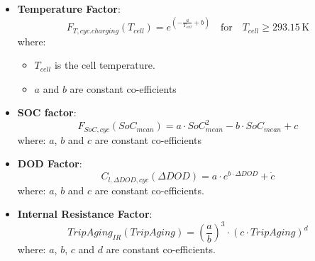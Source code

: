 \begin{itemize}
    \item \textbf{Temperature Factor}:
    \begin{equation}
        F_{T,cyc.charging}(T_{cell}) = e^{\left(-\frac{a}{T_{cell}} + b\right)} \quad \text{for} \quad T_{cell} \geq 293.15 \, \text{K}
    \end{equation}
    where:
    \begin{itemize}
        \item $T_{cell}$ is the cell temperature.
        \item $a$ and $b$ are constant co-efficients
    \end{itemize}

    \item \textbf{SOC factor}: 
    \begin{equation}
        F_{SoC,cyc}(SoC_{mean}) = a \cdot SoC_{mean}^2 - b \cdot SoC_{mean} + c
    \end{equation}
    where:
    $a$, $b$ and $c$ are constant co-efficients

    \item \textbf{DOD Factor}:
    \begin{equation}
        C_{l,\Delta DOD,cyc}(\Delta DOD) = a \cdot e^{b \cdot \Delta DOD} + \dot{c}
    \end{equation}
    where: 
    $a$, $b$ and $c$ are constant co-efficients.

    \item \textbf{Internal Resistance Factor}:
    \begin{equation}
        TripAging_{IR}(TripAging) = \left(\frac{a}{b}\right)^3 \cdot (c \cdot TripAging)^d
    \end{equation}
    where:
    $a$, $b$, $c$ and $d$ are constant co-efficients.
\end{itemize}

